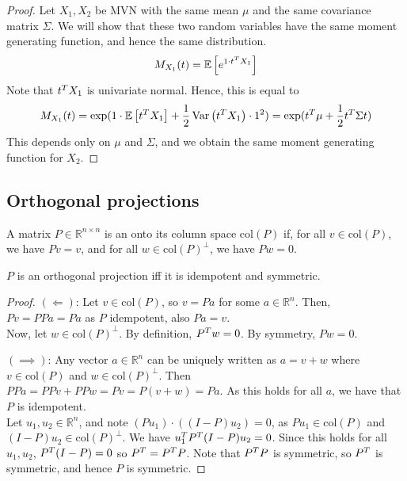 \begin{proof}
	Let $X_1, X_2$ be MVN with the same mean $\mu$ and the same covariance matrix $\Sigma$.
	We will show that these two random variables have the same moment generating function, and hence the same distribution.
	\begin{align*}
		M_{X_1}(t) = \mathbb{E}\left[{ e^{1 \cdot t^T X_1} }\right]
	\end{align*}
	Note that $t^T X_1$ is univariate normal.
	Hence, this is equal to
	\begin{align*}
		M_{X_1}(t) = \exp(1 \cdot \mathbb{E}\left[{t^T X_1}\right] + \frac{1}{2} \operatorname{Var}\left({t^T X_1}\right) \cdot 1^2) = \exp(t^T \mu + \frac{1}{2} t^T \Sigma t)
	\end{align*}
	This depends only on $\mu$ and $\Sigma$, and we obtain the same moment generating function for $X_2$.
\end{proof}

\subsection{Orthogonal projections}
\begin{definition}
	A matrix $P \in \mathbb R^{n \times n}$ is an  onto its column space $\mathrm{col}(P)$ if, for all $v \in \mathrm{col}(P)$, we have $Pv = v$, and for all $w \in \mathrm{col}(P)^\perp$, we have $Pw = 0$.
\end{definition}

\begin{proposition}
	$P$ is an orthogonal projection iff it is idempotent and symmetric.
\end{proposition}

\begin{proof}
	$(\Longleftarrow)$: Let $v \in \mathrm{col}(P)$, so $v = Pa$ for some $a \in \mathbb R^n$.
	Then, $Pv = PPa = Pa$ as $P$ idempotent, also $Pa = v$. \\
	Now, let $w \in \mathrm{col}(P)^\perp$.
	By definition, $P^T w = 0$.
	By symmetry, $Pw = 0$.

	$(\implies)$: Any vector $a \in \mathbb R^n$ can be uniquely written as $a = v + w$ where $v \in \mathrm{col}(P)$ and $w \in \mathrm{col}(P)^\perp$.
	Then $PPa = PPv + PPw = Pv = P(v+w) = Pa$.
	As this holds for all $a$, we have that $P$ is idempotent. \\
	Let $u_1, u_2 \in \mathbb R^n$, and note $(P u_1) \cdot ((I-P) u_2) = 0$, as $P u_1 \in \mathrm{col}(P)$ and $(I-P) u_2 \in \mathrm{col}(P)^\perp$.
	We have $u_1^T P^T (I-P) u_2 = 0$.
	Since this holds for all $u_1, u_2$, $P^T (I-P) = 0$ so $P^T = P^T P$.
	Note that $P^T P$ is symmetric, so $P^T$ is symmetric, and hence $P$ is symmetric.
\end{proof}

